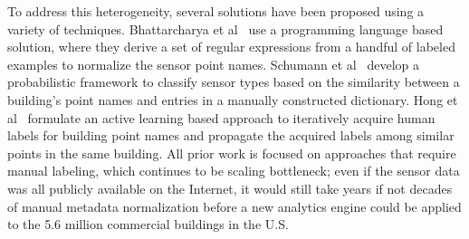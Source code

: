 To address this heterogeneity, several solutions have been proposed using a variety of techniques.
Bhattarcharya et al~\cite{arka} use a programming language based solution,
where they derive a set of regular expressions from a handful of labeled examples
to normalize the sensor point names.
Schumann et al~\cite{ibm} develop a probabilistic framework to classify sensor types
based on the similarity between a building's point names and entries in a manually constructed dictionary.
Hong et al~\cite{cikm} formulate an active learning based approach to iteratively
acquire human labels for building point names and propagate the acquired labels among similar points in the same building. All prior work is focused on approaches that require manual labeling, which
continues to be scaling bottleneck;
even if the sensor data was all publicly available on the Internet, it would still take years if not decades of manual metadata normalization before a new analytics engine could be applied to the 5.6 million commercial buildings in the U.S.


